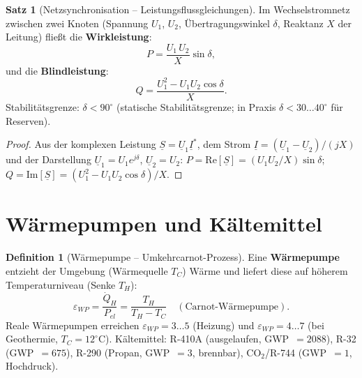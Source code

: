 ﻿\documentclass[a4paper,12pt]{report}
\theoremstyle{definition}
\newtheorem{definition}{Definition}
\newtheorem{satz}{Satz}
\begin{document}
\begin{satz}[Netzsynchronisation -- Leistungsflussgleichungen]
Im Wechselstromnetz zwischen zwei Knoten (Spannung $U_1$, $U_2$, Übertragungswinkel $\delta$,
Reaktanz $X$ der Leitung) fließt die \textbf{Wirkleistung}:
\[
  P = \frac{U_1\,U_2}{X}\sin\delta,
\]
und die \textbf{Blindleistung}:
\[
  Q = \frac{U_1^2 - U_1 U_2\cos\delta}{X}.
\]
Stabilitätsgrenze: $\delta < 90^\circ$ (statische Stabilitätsgrenze;
in Praxis $\delta < 30\ldots40^\circ$ für Reserven).
\end{satz}
\begin{proof}
Aus der komplexen Leistung $\underline{S} = \underline{U}_1 \underline{I}^*$,
dem Strom $\underline{I} = (\underline{U}_1 - \underline{U}_2)/(jX)$
und der Darstellung $\underline{U}_1 = U_1 e^{j\delta}$, $\underline{U}_2 = U_2$:
$P = \mathrm{Re}[\underline{S}] = (U_1 U_2/X)\sin\delta$;
$Q = \mathrm{Im}[\underline{S}] = (U_1^2 - U_1 U_2\cos\delta)/X$.
\end{proof}

\section{Wärmepumpen und Kältemittel}

\begin{definition}[Wärmepumpe -- Umkehrcarnot-Prozess]
Eine \textbf{Wärmepumpe} entzieht der Umgebung (Wärmequelle $T_C$) Wärme
und liefert diese auf höherem Temperaturniveau (Senke $T_H$):
\[
  \varepsilon_{WP} = \frac{\dot{Q}_H}{P_{el}} = \frac{T_H}{T_H - T_C}
  \quad (\text{Carnot-Wärmepumpe}).
\]
Reale Wärmepumpen erreichen $\varepsilon_{WP} = 3\ldots5$ (Heizung)
und $\varepsilon_{WP} = 4\ldots7$ (bei Geothermie, $T_C = 12^\circ\mathrm{C}$).
Kältemittel: R-410A (ausgelaufen, GWP~$=2088$), R-32 (GWP~$=675$),
R-290 (Propan, GWP~$=3$, brennbar), CO$_2$/R-744 (GWP~$=1$, Hochdruck).
\end{definition}
\end{document}
